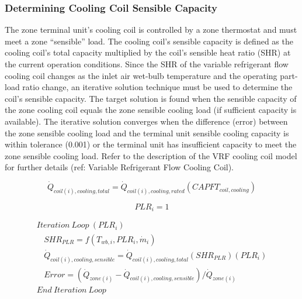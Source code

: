 \subsubsection{Determining Cooling Coil Sensible Capacity}\label{determining-cooling-coil-sensible-capacity}

The zone terminal unit's cooling coil is controlled by a zone thermostat and must meet a zone ``sensible'' load. The cooling coil's sensible capacity is defined as the cooling coil's total capacity multiplied by the coil's sensible heat ratio (SHR) at the current operation conditions. Since the SHR of the variable refrigerant flow cooling coil changes as the inlet air wet-bulb temperature and the operating part-load ratio change, an iterative solution technique must be used to determine the coil's sensible capacity. The target solution is found when the sensible capacity of the zone cooling coil equals the zone sensible cooling load (if sufficient capacity is available). The iterative solution converges when the difference (error) between the zone sensible cooling load and the terminal unit sensible cooling capacity is within tolerance (0.001) or the terminal unit has insufficient capacity to meet the zone sensible cooling load. Refer to the description of the VRF cooling coil model for further details (ref: Variable Refrigerant Flow Cooling Coil).

\begin{equation}
  \dot{Q}_{coil(i),cooling,total} = \dot{Q}_{coil(i),cooling,rated} \left( CAPFT_{coil,cooling} \right)
\end{equation}

\begin{equation}
  PLR_i = 1
\end{equation}

\begin{equation}
  \begin{array}{l}
    Iteration~Loop~(PLR_i) \\
    ~~~~SHR_{PLR} = f \left( T_{wb,i},PLR_i,\dot{m}_i \right) \\
    ~~~~\dot{Q}_{coil(i),cooling,sensible} = \dot{Q}_{coil(i),cooling,total} \left( SHR_{PLR} \right) \left( PLR_i \right) \\
    ~~~~Error = \left( \dot{Q}_{zone(i)} - \dot{Q}_{coil(i),cooling,sensible} \right) / \dot{Q}_{zone(i)} \\
    End~Iteration~Loop
  \end{array}
\end{equation}

